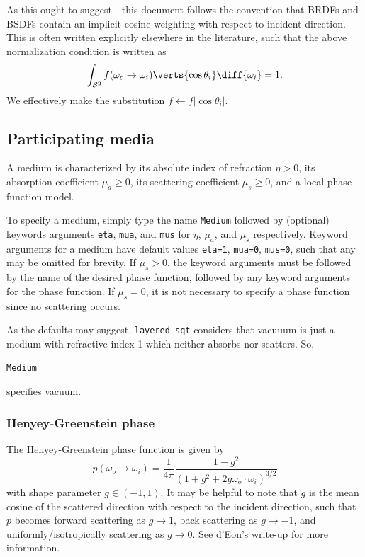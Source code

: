 \documentclass[
    twoside,
    twocolumn,
    letterpaper,
    10pt]{article}
\newcommand\namett[2]{{\color{code#1}\texttt{#2}}}
\begin{document}
As this ought to suggest---this document follows the convention that BRDFs 
and BSDFs contain an implicit cosine-weighting with respect to incident
direction. This is often written explicitly elsewhere in the literature,
such that the above normalization condition is written as
\begin{equation*}
    \int_{\mathcal{S}^2} f(\omega_o\to\omega_i) \verts{\cos{\theta_i}}
    \diff{\omega_i} = 1.
\end{equation*}
We effectively make the substitution $f\gets f|{\cos{\theta_i}}|$.

\subsection{Participating media}
\label{sec:doc-media}

A medium is characterized by its 
absolute index of refraction $\eta > 0$, its absorption coefficient 
$\mu_a \ge 0 $, its scattering coefficient $\mu_s \ge 0$, and a local
phase function model.

To specify a medium, simply type the name \namett{blue}{Medium} followed
by (optional) keywords arguments \texttt{eta}, \texttt{mua}, and
\texttt{mus} for $\eta$, $\mu_a$, and $\mu_s$ respectively. Keyword 
arguments for a medium have default values \texttt{eta=1}, \texttt{mua=0}, 
\texttt{mus=0}, such that any may be omitted for brevity.
If $\mu_s > 0$, the keyword arguments must be followed by the name 
of the desired phase function, followed by any keyword arguments for the 
phase function. If $\mu_s = 0$, it is not necessary to specify a phase function
since no scattering occurs.

As the defaults may suggest, \texttt{layered-sqt} considers that vacuuum 
is just a medium with refractive index 1 which neither absorbs nor scatters. 
So,
\begin{lstlisting}
Medium
\end{lstlisting}
specifies vacuum. 

\subsubsection{Henyey-Greenstein phase}
\label{sec:doc-media-henyey-greenstein}

The Henyey-Greenstein phase function is given by 
\begin{equation*}
    p(\omega_o\to\omega_i) = 
    \frac{1}{4\pi}
    \frac{1-g^2}{(1+g^2+2g\omega_o\cdot\omega_i)^{3/2}}
\end{equation*}
with shape parameter $g\in(-1,1)$. It may be helpful to note 
that $g$ is the mean cosine of the scattered direction with respect to the 
incident direction, such that $p$ becomes forward scattering as $g\to1$, 
back scattering as $g\to-1$, and uniformly/isotropically scattering 
as $g\to0$. See d'Eon's write-up
\cite[p.~19]{dEon:16} for more information.
\end{document}
